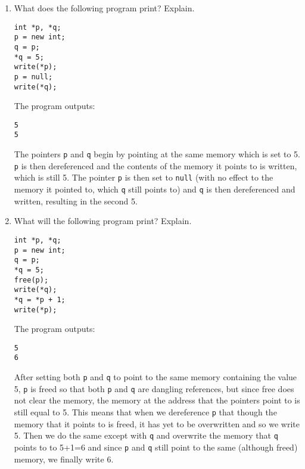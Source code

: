 \documentclass[11pt]{exam}
\begin{document}
\begin{questions}
        \begin{enumerate}[label=(\roman*)]
            \item What does the following program print? Explain.
                \begin{lstlisting}
int *p, *q;
p = new int;
q = p;
*q = 5;
write(*p);
p = null;
write(*q);
                \end{lstlisting}
                
                \begin{framed}
                    The program outputs:
                    \begin{lstlisting}
5
5
                    \end{lstlisting}
                    The pointers {\tt p} and {\tt q} begin by pointing at the same memory which is set to 5. {\tt p} is then dereferenced and the contents of the memory it points to is written, which is still 5. The pointer {\tt p} is then set to {\tt null} (with no effect to the memory it pointed to, which {\tt q} still points to) and {\tt q} is then dereferenced and written, resulting in the second 5.
                \end{framed}

            \item What will the following program print? Explain.
                \begin{lstlisting}
int *p, *q;
p = new int;
q = p;
*q = 5;
free(p);
write(*q);
*q = *p + 1;
write(*p);
                \end{lstlisting}

                \begin{framed}
                    The program outputs:
                    \begin{lstlisting}
5
6
                    \end{lstlisting}
                    After setting both {\tt p} and {\tt q} to point to the same memory containing the value 5, {\tt p} is freed so that both {\tt p} and {\tt q} are dangling references, but since free does not clear the memory, the memory at the address that the pointers point to is still equal to 5. This means that when we dereference {\tt p} that though the memory that it points to is freed, it has yet to be overwritten and so we write 5. Then we do the same except with {\tt q} and overwrite the memory that {\tt q} points to to 5+1=6 and since {\tt p} and {\tt q} still point to the same (although freed) memory, we finally write 6.

                \end{framed}
        

\end{enumerate}
\end{questions}
\end{document}
